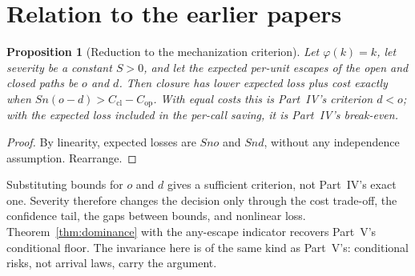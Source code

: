 \documentclass[11pt]{article}
\newtheorem{proposition}[theorem]{Proposition}
\theoremstyle{definition}
\theoremstyle{remark}
\begin{document}
\section{Relation to the earlier papers}\label{sec:relation}
\begin{proposition}[Reduction to the mechanization criterion]\label{prop:reduction}
Let $\varphi(k)=k$, let severity be a constant $S>0$, and let the expected per-unit escapes of the open
and closed paths be $o$ and $d$. Then closure has lower expected loss plus cost exactly when
$Sn(o-d)>C_{\mathrm{cl}}-C_{\mathrm{op}}$. With equal costs this is Part~IV's criterion $d<o$; with the
expected loss included in the per-call saving, it is Part~IV's break-even.
\end{proposition}
\begin{proof}
By linearity, expected losses are $Sno$ and $Snd$, without any independence assumption. Rearrange.
\end{proof}
Substituting bounds for $o$ and $d$ gives a sufficient criterion, not Part~IV's exact one. Severity
therefore changes the decision only through the cost trade-off, the confidence tail, the gaps between
bounds, and nonlinear loss. Theorem~\ref{thm:dominance} with the any-escape indicator recovers
Part~V's conditional floor. The invariance here is of the same kind as Part~V's: conditional risks,
not arrival laws, carry the argument.
\end{document}

